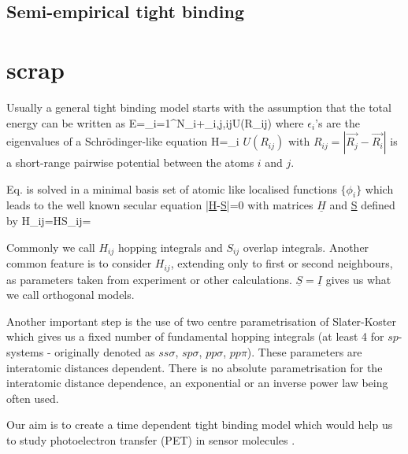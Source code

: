 \subsection{Semi-empirical tight binding}
\section{scrap}
\par{Usually a general tight binding model starts with the assumption that the
total energy can be written as}
\be
E=\sum_{i=1}^{N}\epsilon_i+\sum_{i,j,i\neq j}U(R_{ij})
\ee
where $\epsilon_i$'s are the eigenvalues of a Schr{\"o}dinger-like equation
\be
\label{eigenschro}
H=\epsilon_i
\ee
$U(R_{ij})$ with $R_{ij}=|\vec{R_j}-\vec{R_i}|$ is a short-range pairwise
potential between the atoms $i$ and $j$.
\par{Eq.  is solved in a minimal basis set of atomic like
localised functions $\{\phi_i\}$ which leads to the well known secular equation}
\be
|\underline{H}-\epsilon \underline{S}|=0
\ee
with matrices $\underline{H}$ and {\underline{S}} defined by
\be
H_{ij}=H\quad\quad S_{ij}=
\ee
\par{Commonly we call $H_{ij}$ hopping integrals and $S_{ij}$ overlap
integrals. Another common feature is to consider $H_{ij}$, extending only to
first or second neighbours, as parameters taken from experiment or other
calculations. $\underline{S}=\underline{I}$ gives us what we call orthogonal
models.}
\par{Another important step is the use of two centre parametrisation of
Slater-Koster which gives us a fixed number of fundamental hopping integrals
(at least 4 for $sp$-systems - originally denoted as $ss\sigma$, $sp\sigma$,
$pp\sigma$, $pp\pi$). These parameters are interatomic
distances dependent. There is no absolute parametrisation for the interatomic distance
dependence, an exponential or an inverse power law being often used.}
\par{Our aim is to create a time dependent tight binding model which would help us to study
photoelectron transfer (PET) in sensor molecules \citep{deSilva01b}.}
